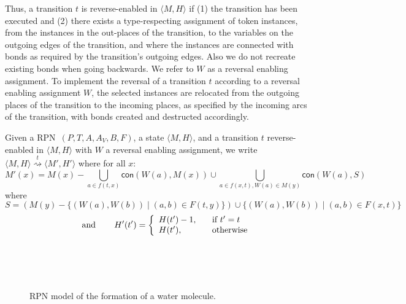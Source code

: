 \documentclass[runningheads]{llncs}
\newcommand{\connected}{\mathsf{con}}
\newcommand{\state}[2]{\langle {#1}, {#2}\rangle}
\newcommand{\rtrans}[1]{\ensuremath{\stackrel{#1}{\rightsquigarrow}}}
\newcommand{\RPN}{\textsc{RPN\ }}
\begin{document}
Thus, a transition $t$ is reverse-enabled in $\state{M}{H}$ if  
(1) the transition has been executed and (2) there exists a type-respecting assignment of token instances,
from the instances in the out-places of the transition, to the variables on the outgoing
edges of the transition, and where the instances are connected with bonds as required by
the transition's outgoing edges.  Also we do not recreate existing bonds when going backwards. 
We refer to $W$ as a reversal enabling assignment.
To implement the reversal of a transition $t$ according to a reversal enabling assignment $W$, 
the selected instances are relocated from  the outgoing places of the transition to the incoming places,
as specified
by the incoming arcs of the transition, with bonds created and destructed accordingly.

\begin{definition}\label{causal}{\rm
		Given a \RPN $(P,T, A, A_V, B, F)$, 
		a state $\langle M, H\rangle$, and a transition $t$ reverse-enabled in $\state{M}{H}$  with 
		$W$ a reversal enabling assignment, we write $ \state{M}{H}
		\rtrans{t} \state{M'}{H'}$   where for all $x$:
		\[
		M'(x) =   M(x)- \bigcup_{a\in f(t,x)} \connected(W(a), M(x)) 
		\cup  \bigcup_{a\in f(x,t),W(a)\in M(y)} \connected(W(a),S)\]
		where $S= (M(y)
		-\{(W(a),W(b))\mid (a,b)\in F(t,y)\})\cup \{ (W(a),W(b))\mid (a,b)\in F(x,t) \}$
		\[
		\hspace{0.3in}\mbox{and}\hspace{0.3in}
		H'(t') = \left\{
		\begin{array}{ll}
		H(t') - 1, \hspace{0.3cm} \;\;\textrm{ if } t' = t  \; \\
		H(t'),\hspace{1cm}  \;\textrm{ otherwise }
		\end{array}
		\right.
		\]
}\end{definition}	



\begin{figure}
	\centering
	\\
	\vspace{-0.25cm}
	\\\vspace{-0.25cm}
	\\	\caption{RPN model of the formation of a water molecule.}
	\label{RPNmodel}
\end{figure}
\end{document}
